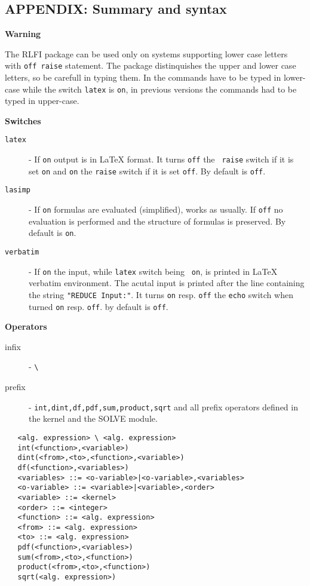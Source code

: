 


\vskip0.5cm

\subsection{APPENDIX: Summary and syntax}

{\bf Warning}

The RLFI package can be used only on systems supporting lower case
letters with {\tt off raise} statement. The package distinquishes the
upper and lower case letters, so be carefull in typing them.
In  the \REDUCE commands have to be typed in lower-case
while the switch {\tt latex} is {\tt on}, in previous versions
the commands had to be typed in upper-case.

{\bf Switches}

\begin{description}
\item[{\tt latex}]
- If {\tt on} output is in \LaTeX{} format. It turns {\tt off} the {\tt
raise} switch if it is set {\tt on} and {\tt on} the {\tt raise} switch
if it is set {\tt off}. By default is {\tt off}.
\item[{\tt lasimp}]
- If {\tt on} formulas are evaluated (simplified), \REDUCE{} works
as usually. If {\tt off} no evaluation is performed and the structure
of formulas is preserved. By default is {\tt on}.
\item[{\tt verbatim}]
- If {\tt on} the \REDUCE{} input, while {\tt latex} switch being {\tt
on}, is printed in \LaTeX{} verbatim environment. The acutal \REDUCE{}
input is printed after the line containing the string {\tt "REDUCE
Input:"}.  It turns {\tt on} resp. {\tt off} the {\tt echo} switch when
turned {\tt on} resp. {\tt off}. by default is {\tt off}.
\end{description}

{\bf Operators}

\begin{description}
\item[infix] - \verb+\+
\item[prefix] - {\tt int,dint,df,pdf,sum,product,sqrt} and all \REDUCE{}
prefix operators defined in the \REDUCE{} kernel and the SOLVE module.
\end{description}

\begin{verbatim}
   <alg. expression> \ <alg. expression>
   int(<function>,<variable>)
   dint(<from>,<to>,<function>,<variable>)
   df(<function>,<variables>)
   <variables> ::= <o-variable>|<o-variable>,<variables>
   <o-variable> ::= <variable>|<variable>,<order>
   <variable> ::= <kernel>
   <order> ::= <integer>
   <function> ::= <alg. expression>
   <from> ::= <alg. expression>
   <to> ::= <alg. expression>
   pdf(<function>,<variables>)
   sum(<from>,<to>,<function>)
   product(<from>,<to>,<function>)
   sqrt(<alg. expression>)
\end{verbatim}

